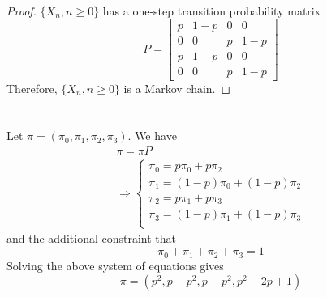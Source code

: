 \documentclass[
  coursecode={MTHE 455},
  assignmentname={Assignment \assignmentnumber},
  studentnumber=20053722,
  name={Bryan Hoang},
]{
  ltxanswer%
}
\begin{document}
  \begin{questions}
    \setcounter{question}{\questionnumber}
    \addtocounter{question}{-1}
    \question[5]\
    \begin{parts}
      \part{}
      \begin{solution}
        \begin{proof}
          \(\{X_{n}, n \ge 0\}\) has a one-step transition probability matrix
          \begin{equation*}
            P = \begin{bmatrix}
              p & 1-p & 0 & 0   \\
              0 & 0   & p & 1-p \\
              p & 1-p & 0 & 0   \\
              0 & 0   & p & 1-p
            \end{bmatrix}
          \end{equation*}
          Therefore, \(\{X_{n}, n \ge 0\}\) is a Markov chain.
        \end{proof}
      \end{solution}

      \part{}
      \begin{solution}
        Let \(\pi=(\pi_{0},\pi_{1},\pi_{2},\pi_{3})\). We have
        \begin{gather*}
          \pi = \pi P \\
          \Rightarrow \begin{cases}
            \pi_{0} = p\pi_{0} + p\pi_{2}         \\
            \pi_{1} = (1-p)\pi_{0} + (1-p)\pi_{2} \\
            \pi_{2} = p\pi_{1} + p\pi_{3}         \\
            \pi_{3} = (1-p)\pi_{1} + (1-p)\pi_{3} \\
          \end{cases}
        \end{gather*}
        and the additional constraint that
        \begin{equation*}
          \pi_{0} + \pi_{1} + \pi_{2} + \pi_{3} = 1
        \end{equation*}
        Solving the above system of equations gives
        \begin{equation*}
          \boxed{\pi = (p^{2}, p-p^{2}, p-p^{2}, p^{2}-2p+1)}
        \end{equation*}
      \end{solution}
    \end{parts}
  \end{questions}
\end{document}
